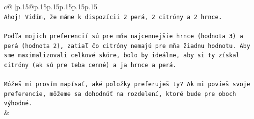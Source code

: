 \documentclass{article}
\begin{document}
{\begin{supertabular}{c@{$\;$}|p{.15\linewidth}@{}p{.15\linewidth}p{.15\linewidth}p{.15\linewidth}p{.15\linewidth}p{.15\linewidth}}
{{{\\ 
\texttt{Ahoj! Vidím, že máme k dispozícii 2 perá, 2 citróny a 2 hrnce.} \\
\\ 
\texttt{Podľa mojich preferencií sú pre mňa najcennejšie hrnce (hodnota 3) a perá (hodnota 2), zatiaľ čo citróny nemajú pre mňa žiadnu hodnotu. Aby sme maximalizovali celkové skóre, bolo by ideálne, aby si ty získal citróny (ak sú pre teba cenné) a ja hrnce a perá.} \\
\\ 
\texttt{Môžeš mi prosím napísať, aké položky preferuješ ty? Ak mi povieš svoje preferencie, môžeme sa dohodnúť na rozdelení, ktoré bude pre oboch výhodné.} \\
            }
        }
    }
    & \\ \\


\end{supertabular}}
\end{document}
